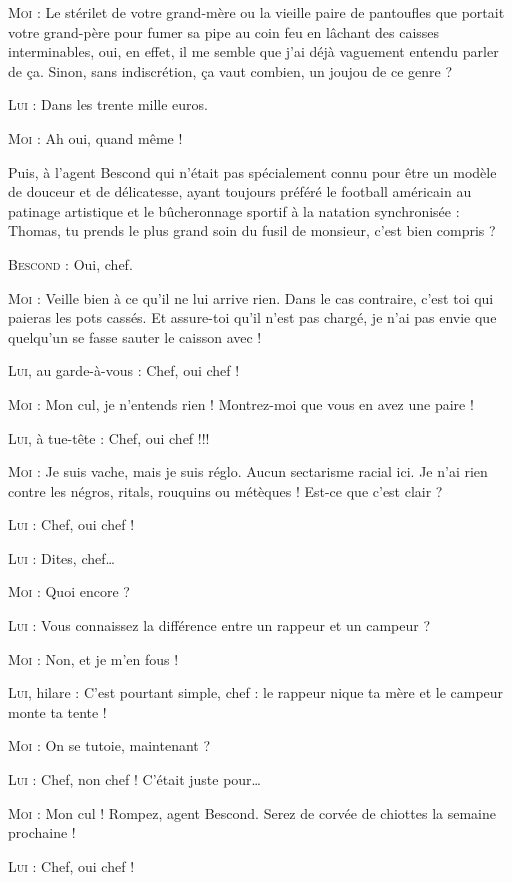 \begin{dialogue}
\textsc{Moi} : Le stérilet de votre grand-mère ou la vieille paire de pantoufles que portait votre grand-père pour fumer sa pipe au coin feu en lâchant des caisses interminables, oui, en effet, il me semble que j’ai déjà vaguement entendu parler de ça. Sinon, sans indiscrétion, ça vaut combien, un joujou de ce genre ?

\textsc{Lui} : Dans les trente mille euros.

\textsc{Moi} : Ah oui, quand même !

Puis, à l’agent Bescond qui n’était pas spécialement connu pour être un modèle de douceur et de délicatesse, ayant toujours préféré le football américain au patinage artistique et le bûcheronnage sportif à la natation synchronisée : Thomas, tu prends le plus grand soin du fusil de monsieur, c’est bien compris ?

\textsc{Bescond} : Oui, chef.

\textsc{Moi} : Veille bien à ce qu’il ne lui arrive rien. Dans le cas contraire, c’est toi qui paieras les pots cassés. Et assure-toi qu’il n’est pas chargé, je n’ai pas envie que quelqu’un se fasse sauter le caisson avec !

\textsc{Lui}, au garde-à-vous : Chef, oui chef !

\textsc{Moi} : Mon cul, je n’entends rien ! Montrez-moi que vous en avez une paire !

\textsc{Lui}, à tue-tête : Chef, oui chef !!!

\textsc{Moi} : Je suis vache, mais je suis réglo. Aucun sectarisme racial ici. Je n’ai rien contre les négros, ritals, rouquins ou métèques ! Est-ce que c’est clair ?

\textsc{Lui} : Chef, oui chef !

\textsc{Lui} : Dites, chef…

\textsc{Moi} : Quoi encore ?

\textsc{Lui} : Vous connaissez la différence entre un rappeur et un campeur ?

\textsc{Moi} : Non, et je m’en fous !

\textsc{Lui}, hilare : C’est pourtant simple, chef : le rappeur nique ta mère et le campeur monte ta tente !

\textsc{Moi} : On se tutoie, maintenant ?

\textsc{Lui} : Chef, non chef ! C’était juste pour…

\textsc{Moi} : Mon cul ! Rompez, agent Bescond. Serez de corvée de chiottes la semaine prochaine !

\textsc{Lui} : Chef, oui chef !

\end{dialogue}

